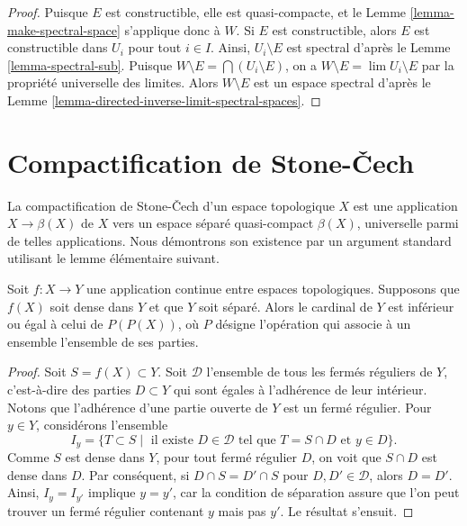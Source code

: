 \begin{proof}
Puisque $E$ est constructible, elle est quasi-compacte, et le
Lemme \ref{lemma-make-spectral-space} s'applique donc à $W$.
Si $E$ est constructible, alors $E$ est constructible dans $U_i$
pour tout $i \in I$. Ainsi, $U_i \setminus E$
est spectral d'après le Lemme \ref{lemma-spectral-sub}.
Puisque $W \setminus E = \bigcap (U_i \setminus E)$, on a
$W \setminus E = \lim U_i \setminus E$ par la propriété universelle des limites.
Alors $W \setminus E$ est un espace spectral d'après le
Lemme \ref{lemma-directed-inverse-limit-spectral-spaces}.
\end{proof}






\section{Compactification de Stone-{\v C}ech}
\label{section-stone-cech}

\noindent
La compactification de Stone-{\v C}ech d'un espace topologique $X$
est une application $X \to \beta(X)$ de $X$ vers un espace séparé
quasi-compact $\beta(X)$, universelle parmi de telles applications. Nous
démontrons son existence par un argument standard utilisant le lemme élémentaire
suivant.

\begin{lemma}
\label{lemma-dense-image}
Soit $f : X \to Y$ une application continue entre espaces topologiques. Supposons
que $f(X)$ soit dense dans $Y$ et que $Y$ soit séparé. Alors le cardinal de
$Y$ est inférieur ou égal à celui de $P(P(X))$, où $P$ désigne l'opération
qui associe à un ensemble l'ensemble de ses parties.
\end{lemma}

\begin{proof}
Soit $S = f(X) \subset Y$. Soit $\mathcal{D}$ l'ensemble de tous les
fermés réguliers de $Y$, c'est-à-dire des parties $D \subset Y$ qui
sont égales à l'adhérence de leur intérieur. Notons que l'adhérence d'une
partie ouverte de $Y$ est un fermé régulier. Pour $y \in Y$, considérons
l'ensemble
$$
I_y = \{T \subset S \mid \text{ il existe }
D \in \mathcal{D}\text{ tel que }T = S \cap D\text{ et }y \in D\}.
$$
Comme $S$ est dense dans $Y$, pour tout fermé régulier $D$, on voit
que $S \cap D$ est dense dans $D$. Par conséquent, si
$D \cap S = D' \cap S$ pour $D, D' \in \mathcal{D}$, alors
$D = D'$. Ainsi, $I_y = I_{y'}$ implique $y = y'$, car la condition de
séparation assure que l'on peut trouver un fermé régulier contenant $y$
mais pas $y'$. Le résultat s'ensuit.
\end{proof}

